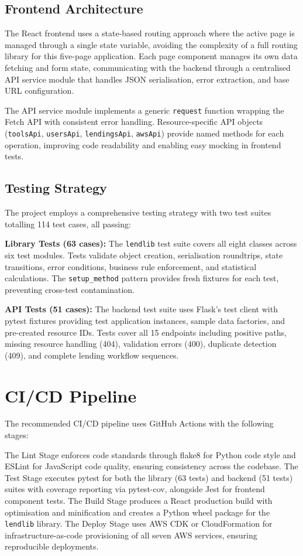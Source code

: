 \documentclass[conference]{IEEEtran}
\begin{document}
\subsection{Frontend Architecture}
The React frontend uses a state-based routing approach where the active page is managed through a single state variable, avoiding the complexity of a full routing library for this five-page application. Each page component manages its own data fetching and form state, communicating with the backend through a centralised API service module that handles JSON serialisation, error extraction, and base URL configuration.

The API service module implements a generic \texttt{request} function wrapping the Fetch API with consistent error handling. Resource-specific API objects (\texttt{toolsApi}, \texttt{usersApi}, \texttt{lendingsApi}, \texttt{awsApi}) provide named methods for each operation, improving code readability and enabling easy mocking in frontend tests.

\subsection{Testing Strategy}
The project employs a comprehensive testing strategy with two test suites totalling 114 test cases, all passing:

\textbf{Library Tests (63 cases):} The \texttt{lendlib} test suite covers all eight classes across six test modules. Tests validate object creation, serialisation roundtrips, state transitions, error conditions, business rule enforcement, and statistical calculations. The \texttt{setup\_method} pattern provides fresh fixtures for each test, preventing cross-test contamination.

\textbf{API Tests (51 cases):} The backend test suite uses Flask's test client with pytest fixtures providing test application instances, sample data factories, and pre-created resource IDs. Tests cover all 15 endpoints including positive paths, missing resource handling (404), validation errors (400), duplicate detection (409), and complete lending workflow sequences.

\section{CI/CD Pipeline}

The recommended CI/CD pipeline uses GitHub Actions with the following stages:

The Lint Stage enforces code standards through flake8 for Python code style and ESLint for JavaScript code quality, ensuring consistency across the codebase. The Test Stage executes pytest for both the library (63 tests) and backend (51 tests) suites with coverage reporting via pytest-cov, alongside Jest for frontend component tests. The Build Stage produces a React production build with optimisation and minification and creates a Python wheel package for the \texttt{lendlib} library. The Deploy Stage uses AWS CDK or CloudFormation for infrastructure-as-code provisioning of all seven AWS services, ensuring reproducible deployments.
\end{document}
